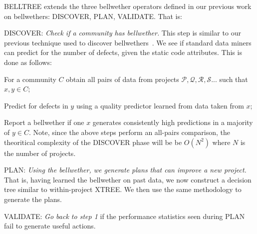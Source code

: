 BELLTREE extends the three bellwether operators defined in our previous work~\citep{krishna17b} on bellwethers: DISCOVER, PLAN, VALIDATE. That is:~ 
\be
  \item DISCOVER: {\em Check if a community has bellwether.} 
  This step is similar to our previous technique used to discover bellwethers~\citep{krishna16}. We see if standard data miners can predict for the number of defects, given the static code attributes. This is done as follows:~ 
  \bi 
  \item
  For a community $C$ obtain all pairs of data from
  projects $\mathcal{P, Q, R, S...}$ such that $x, y \in C$;
  \item
  Predict for defects in $y$ using a quality predictor learned from data taken from $x$;
  \item
  Report a bellwether if one $x$ generates consistently high predictions in a majority of $y \in C$.
  \ei
   {\color{steel} Note, since the above steps perform an all-pairs comparison, the theoritical complexity of the DISCOVER phase will be be $O(N^2)$ where $N$ is the number of projects.}
  \item PLAN: {\em Using the bellwether, we generate plans that can improve a new project.} That is, 
  having learned the bellwether on past data, we now construct a decision tree similar to within-project XTREE. We then use the same methodology to generate the plans.
  \item VALIDATE: {\em Go back to step 1} if the performance statistics seen during PLAN fail to generate useful actions.
  \ee
  

